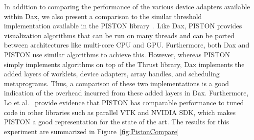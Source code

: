 \documentclass[conference]{IEEEtran}
\newcommand*{\lcite}[1]{~\cite{#1}}
\newcommand*{\scite}[1]{~\cite{#1}}
\newcommand{\etal}{et al.}
\begin{document}
In addition to comparing the performance of the various device adapters
available within Dax, we also present a comparison to the similar threshold
implementation available in the PISTON library\lcite{PISTON}.  Like Dax,
PISTON provides visualization algorithms that can be run on many threads
and can be ported between architectures like multi-core CPU and GPU.
Furthermore, both Dax and PISTON use similar algorithms to achieve this.
However, whereas PISTON simply implements algorithms on top of the Thrust
library, Dax implements the added layers of worklets, device adapters,
array handles, and scheduling metaprograms.  Thus, a comparison of these
two implementations is a good indication of the overhead incurred from
these added layers in Dax.  Furthermore, Lo \etal\scite{PISTON} provide
evidence that PISTON has comparable performance to tuned code in other
libraries such as parallel VTK and NVIDIA SDK, which makes PISTON a good
representation for the state of the art.  The results for this experiment
are summarized in Figure~\ref{fig:PistonCompare}
\end{document}
